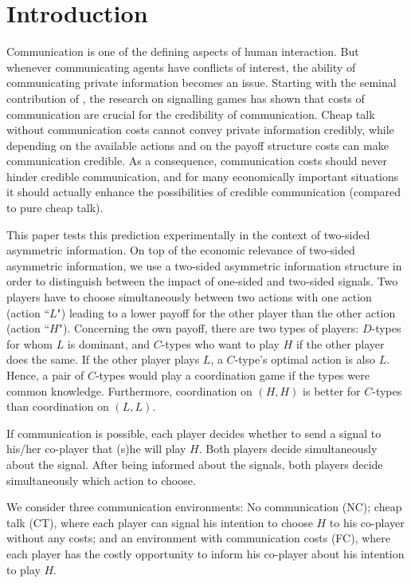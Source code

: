 \documentclass[12pt]{article}
\theoremstyle{break}
\begin{document}
\pagebreak
\section{Introduction}
Communication is one of the defining aspects of human interaction. But whenever communicating agents have conflicts of interest, the ability of communicating private information becomes an issue. Starting with the seminal contribution of \cite{Spence1973}, the research on signalling games has shown that costs of communication are crucial for the credibility of communication. Cheap talk without communication costs cannot convey private information credibly, while depending on the available actions and on the payoff structure costs can make communication credible. As a consequence, communication costs should never hinder credible communication, and for many economically important situations it should actually enhance the possibilities of credible communication (compared to pure cheap talk).

This paper tests this prediction experimentally in the context of two-sided asymmetric information. On top of the economic relevance of two-sided asymmetric information, we use a two-sided asymmetric information structure in order to distinguish between the impact of one-sided and two-sided signals. Two players have to choose simultaneously between two actions with one action (action ``$L$") leading to a lower payoff for the other player than the other action (action ``$H$"). Concerning the own payoff, there are two types of players: $D$-types for whom $L$ is dominant, and $C$-types who want to play $H$ if the other player does the same. If the other player plays $L$, a $C$-type's optimal action is also $L$. Hence, a pair of $C$-types would play a coordination game if the types were common knowledge. Furthermore, coordination on $(H,H)$ is better for $C$-types than coordination on $(L,L)$.

If communication is possible, each player decides whether to send a signal to his/her co-player that (s)he will play $H$. Both players decide simultaneously about the signal. After being informed about the signals, both players decide simultaneously which action to choose.

We consider three communication environments: No communication (NC); cheap talk (CT), where each player can signal his intention to choose $H$ to his co-player without any costs; and an environment with communication costs (FC), where each player has the costly opportunity to inform his co-player about his intention to play $H$.
\end{document}
